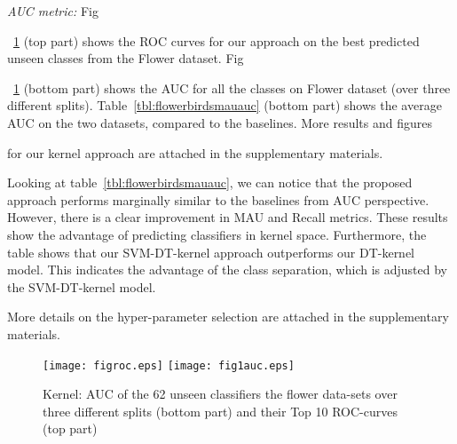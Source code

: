 \textit{AUC metric: } Fig\ignore{~\ref{F:top10} }~\ref{F:AUCstop10} (top part) shows the ROC curves for our approach on the best predicted unseen classes from the Flower dataset. Fig\ignore{~\ref{F:AUCs}}~\ref{F:AUCstop10} (bottom part) shows the AUC for all the classes on Flower dataset (over three different splits). Table~\ref{tbl:flowerbirdsmauauc} (bottom part)  shows the average AUC on the two datasets, compared to the baselines. More results and figures  for our kernel approach are attached in the supplementary materials.

Looking at table~\ref{tbl:flowerbirdsmauauc}, we can notice that the proposed approach performs marginally similar to the baselines from AUC perspective. However, there is a clear improvement  in MAU  and Recall metrics. These results show the advantage of predicting classifiers in kernel space. Furthermore, the table shows that our SVM-DT-kernel approach outperforms our DT-kernel model. This indicates the advantage of the class separation, which is adjusted by the SVM-DT-kernel model.  More details on the hyper-parameter selection are attached in the supplementary materials. 
\begin{figure}[t!]
 \centering
\texttt{[image: figroc.eps]}
\texttt{[image: fig1auc.eps]}
\caption{Kernel: AUC of the 62 unseen classifiers the flower data-sets over three different splits (bottom part) and their Top 10 ROC-curves (top part)}
\label{F:AUCstop10}
\end{figure}








